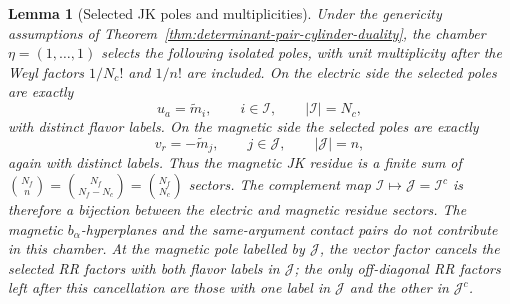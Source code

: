 \documentclass[11pt,a4paper]{article}
\numberwithin{equation}{section}
\theoremstyle{plain}
\newtheorem{lemma}[theorem]{Lemma}
\theoremstyle{definition}
\theoremstyle{remark}
\begin{document}
\begin{lemma}[Selected JK poles and multiplicities]
\label{lem:selected-JK-poles-detpair}
Under the genericity assumptions of Theorem~\ref{thm:determinant-pair-cylinder-duality}, the chamber \(\eta=(1,\ldots,1)\) selects the following isolated poles, with unit multiplicity after the Weyl factors \(1/N_c!\) and \(1/n!\) are included.
On the electric side the selected poles are exactly
\begin{equation}
u_a=\widetilde m_i,
\qquad i\in\mathcal I,
\qquad |\mathcal I|=N_c,
\label{eq:lemma-electric-selected-poles}
\end{equation}
with distinct flavor labels.  On the magnetic side the selected poles are exactly
\begin{equation}
v_r=-\widetilde m_j,
\qquad j\in\mathcal J,
\qquad |\mathcal J|=n,
\label{eq:lemma-magnetic-selected-poles}
\end{equation}
again with distinct labels.  Thus the magnetic JK residue is a finite sum of \(\binom{N_f}{n}=\binom{N_f}{N_f-N_c}=\binom{N_f}{N_c}\) sectors.  The complement map \(\mathcal I\mapsto\mathcal J=\mathcal I^c\) is therefore a bijection between the electric and magnetic residue sectors.  The magnetic \(b_\alpha\)-hyperplanes and the same-argument contact pairs do not contribute in this chamber.  At the magnetic pole labelled by \(\mathcal J\), the vector factor cancels the selected RR factors with both flavor labels in \(\mathcal J\); the only off-diagonal RR factors left after this cancellation are those with one label in \(\mathcal J\) and the other in \(\mathcal J^c\).
\end{lemma}
\end{document}
